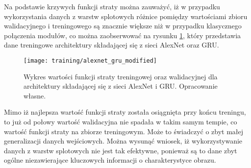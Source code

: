 Na podstawie krzywych funkcji straty można zauważyć, iż w przypadku wykorzystania danych z warstw splotowych różnice pomiędzy wartościami zbioru walidacyjnego i treningowego są znacznie większe niż w przypadku klasycznego połączenia modułów, co można zaobserwować na rysunku \ref{fig:training-alexnet-gru-modified}, który przedstawia dane treningowe architektury składającej się z sieci AlexNet oraz GRU.
\begin{figure}[H]
    \centering
    \texttt{[image: training/alexnet\_gru\_modified]}
    \caption{Wykres wartości funkcji straty treningowej oraz walidacyjnej dla architektury składającej się z sieci AlexNet i GRU. Opracowanie własne.}
    \label{fig:training-alexnet-gru-modified}
\end{figure}
\noindent Mimo iż najlepsza wartość funkcji straty została osiągnięta przy końcu treningu, to już od połowy wartość walidacyjna nie spadała w takim samym tempie, co wartość funkcji straty na zbiorze treningowym. Może to świadczyć o zbyt małej generalizacji danych wejściowych. Można wysunąć wniosek, iż wykorzystywanie danych z warstw splotowych nie jest tak efektywne, ponieważ są to dane zbyt ogólne niezawierające kluczowych informacji o charakterystyce obrazu.
